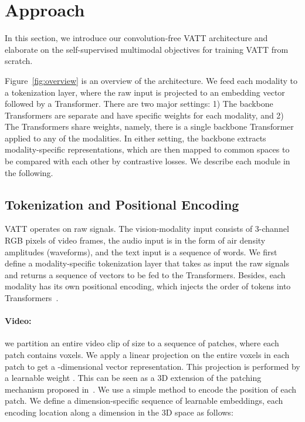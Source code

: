 \documentclass[10pt,twocolumn,letterpaper]{article}
\newcommand{\ours}{VATT\xspace}
\begin{document}
\section{Approach}
In this section, we introduce our convolution-free \ours architecture and elaborate on the self-supervised multimodal objectives for training \ours from scratch.

Figure~\ref{fig:overview} is an overview of the architecture. We feed each modality to a tokenization layer, where the raw input is projected to an embedding vector followed by a Transformer. There are two major settings: 1) The backbone Transformers are separate and have specific weights for each modality, and 2) The Transformers share weights, namely, there is a single backbone Transformer applied to any of the modalities. In either setting, the backbone extracts modality-specific representations, which are then mapped to common spaces to be compared with each other by contrastive losses. We describe each module in the following.

\subsection{Tokenization and Positional Encoding}
\ours operates on raw signals. The vision-modality input consists of 3-channel RGB pixels of video frames, the audio input is in the form of air density amplitudes (waveforms), and the text input is a sequence of words. We first define a modality-specific tokenization layer that takes as input the raw signals and returns a sequence of vectors to be fed to the Transformers. Besides, each modality has its own positional encoding, which injects the order of tokens into Transformers~\cite{vaswani2017attention}.

\paragraph{Video:} we partition an entire video clip of size  to a sequence of  patches, where each patch contains  voxels. We apply a linear projection on the entire voxels in each patch to get a -dimensional vector representation. This projection is performed by a learnable weight . This can be seen as a 3D extension of the patching mechanism proposed in~\cite{dosovitskiy2021an}. We use a simple method to encode the position of each patch. We define a dimension-specific sequence of learnable embeddings, each encoding location  along a dimension in the 3D space as follows:
\end{document}
